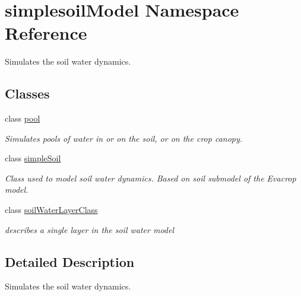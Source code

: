 \hypertarget{namespacesimplesoil_model}{}\section{simplesoil\+Model Namespace Reference}
\label{namespacesimplesoil_model}


Simulates the soil water dynamics.  


\subsection*{Classes}
\begin{DoxyCompactItemize}
\item 
class \mbox{\hyperlink{classsimplesoil_model_1_1pool}{pool}}
\begin{DoxyCompactList}\small\item\em Simulates pools of water in or on the soil, or on the crop canopy. \end{DoxyCompactList}\item 
class \mbox{\hyperlink{classsimplesoil_model_1_1simple_soil}{simple\+Soil}}
\begin{DoxyCompactList}\small\item\em Class used to model soil water dynamics. Based on soil submodel of the Evacrop model. \end{DoxyCompactList}\item 
class \mbox{\hyperlink{classsimplesoil_model_1_1soil_water_layer_class}{soil\+Water\+Layer\+Class}}
\begin{DoxyCompactList}\small\item\em describes a single layer in the soil water model \end{DoxyCompactList}\end{DoxyCompactItemize}


\subsection{Detailed Description}
Simulates the soil water dynamics. 